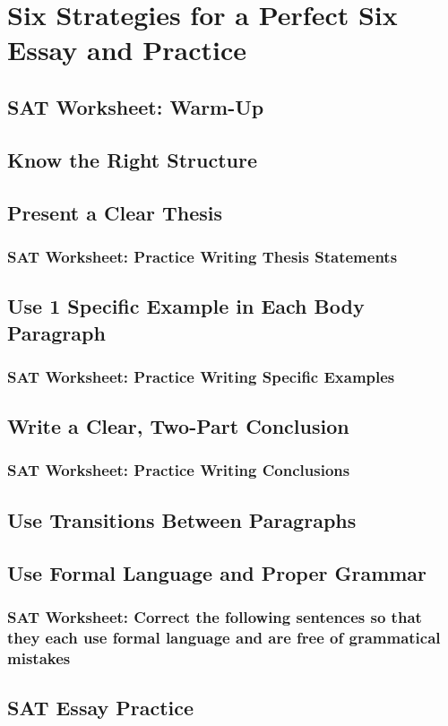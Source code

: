 \chapter{Six Strategies for a Perfect Six Essay and Practice}

\section{SAT Worksheet: Warm-Up}
\section{Know the Right Structure}
\section{Present a Clear Thesis}
\subsection{SAT Worksheet: Practice Writing Thesis Statements}
\section{Use 1 Specific Example in Each Body Paragraph}
\subsection{SAT Worksheet: Practice Writing Specific Examples}
\section{Write a Clear, Two-Part Conclusion}
\subsection{SAT Worksheet: Practice Writing Conclusions}
\section{Use Transitions Between Paragraphs}
\section{Use Formal Language and Proper Grammar}
\subsection{SAT Worksheet: Correct the following sentences so that they each use formal language and are free of grammatical mistakes}
\section{SAT Essay Practice}